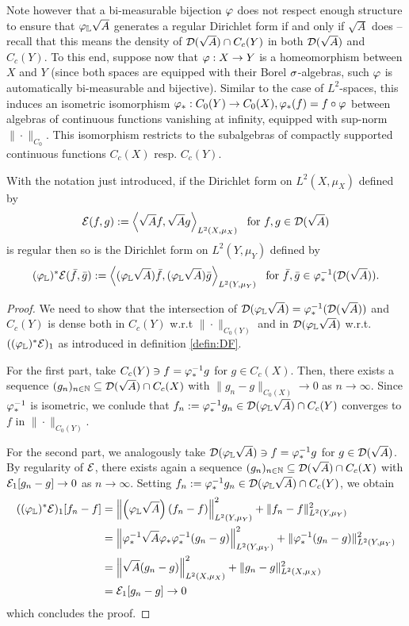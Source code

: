 Note however that a bi-measurable bijection $\varphi$ does not respect enough structure to ensure that 
$\varphi_{\mathbb{L}} \sqrt{A}$ generates a regular Dirichlet form if and only if $\sqrt{A}$ does -- recall that this means the density of $\mathcal{D}(\sqrt{A})\cap C_c(Y)$ in both $\mathcal{D}(\sqrt{A})$ and $C_c(Y)$. To this end, suppose now that $\varphi:X\to Y$ is a homeomorphism between $X$ and $Y$ (since both spaces are equipped with their Borel $\sigma$-algebras, such $\varphi$ is automatically bi-measurable and bijective). Similar to the case of $L^2$-spaces, this induces an isometric isomorphism $\varphi_*:C_0(Y)\to C_0(X), \varphi_*(f)=f\circ\varphi$ between algebras of continuous functions vanishing at infinity, equipped with sup-norm $\|\cdot\|_{C_0}$. This isomorphism restricts to the subalgebras of compactly supported continuous functions $C_c(X)$ resp. $C_c(Y)$. 

\begin{lem}
  With the notation just introduced, if the Dirichlet form on $L^2(X,\mu_X)$ defined by 
  \[
    \cE(f,g):=\left<\sqrt{A}f,\sqrt{A}g\right>_{L^2(X,\mu_X)}\ \text{ for } f,g\in\cD(\sqrt{A})
  \]
 is regular then so is the Dirichlet form on $L^2(Y,\mu_Y)$ defined by 
 \[
   (\varphi_{\mathbb{L}})^*\mathcal{E}(\bar f,\bar g):=\left<(\varphi_{\mathbb{L}}\sqrt{A})\bar f,(\varphi_{\mathbb{L}}\sqrt{A})\bar g\right>_{L^2(Y,\mu_Y)}\ \text{ for } \bar f,\bar g\in\varphi_*^{-1}(\mathcal{D}(\sqrt{A})).
 \]
\end{lem}
\begin{proof}
  We need to show that the intersection of $\mathcal{D}(\varphi_{\mathbb{L}}\sqrt{A})=\varphi_*^{-1}(\mathcal{D}(\sqrt{A}))$ and $C_c(Y)$ is dense both in $C_c(Y)$ w.r.t $\|\cdot\|_{C_0(Y)}$ and in $\mathcal{D}(\varphi_{\mathbb{L}}\sqrt{A})$ w.r.t. $((\varphi_{\mathbb{L}})^*\mathcal{E})_1$ as introduced in definition \ref{defin:DF}.
  
  For the first part, take $C_c(Y)\ni f=\varphi_*^{-1} g$ for $g\in C_c(X)$. Then, there exists a sequence $(g_n)_{n\in\mathbb{N}}\subseteq \mathcal{D}(\sqrt{A})\cap C_c(X)$ with $\|g_n-g\|_{C_0(X)}\to 0$ as $n\to\infty$. Since $\varphi_*^{-1}$ is isometric, we conlude that $f_n:=\varphi_*^{-1}g_n\in \mathcal{D}(\varphi_{\mathbb{L}}\sqrt{A})\cap C_c(Y)$ converges to $f$ in 
  $\|\cdot\|_{C_0(Y)}$.
  
  For the second part, we analogously take $\mathcal{D}(\varphi_{\mathbb{L}}\sqrt{A})\ni f=\varphi_*^{-1} g$ for $g\in\mathcal{D}(\sqrt{A})$. By regularity of $\mathcal{E}$, there exists again a sequence $(g_n)_{n\in\mathbb{N}}\subseteq\mathcal{D}(\sqrt{A})\cap C_c(X)$ with $\mathcal{E}_1[g_n-g]\to 0$ as $n\to\infty$. Setting $f_n:=\varphi_*^{-1} g_n\in\mathcal{D}(\varphi_{\mathbb{L}}\sqrt{A})\cap C_c(Y)$, we obtain
  \begin{align*}
    ((\varphi_{\mathbb{L}})^*\mathcal{E})_1[f_n-f]
    &=\left\|\left(\varphi_{\mathbb{L}}\sqrt{A}\right)(f_n-f)\right\|_{L^2(Y,\mu_Y)}^2
        +\|f_n-f\|_{L^2(Y,\mu_Y)}^2\\
    &=\left\|\varphi_*^{-1}\sqrt{A}\varphi_*\varphi_*^{-1}(g_n-g)\right\|_{L^2(Y,\mu_Y)}^2
        +\|\varphi_*^{-1}(g_n-g)\|_{L^2(Y,\mu_Y)}^2\\
    &=\left\|\sqrt{A}(g_n-g)\right\|_{L^2(X,\mu_X)}^2+\|g_n-g\|_{L^2(X,\mu_X)}^2\\
    &=\mathcal{E}_1[g_n-g]\to 0
  \end{align*}
  which concludes the proof.
\end{proof}

